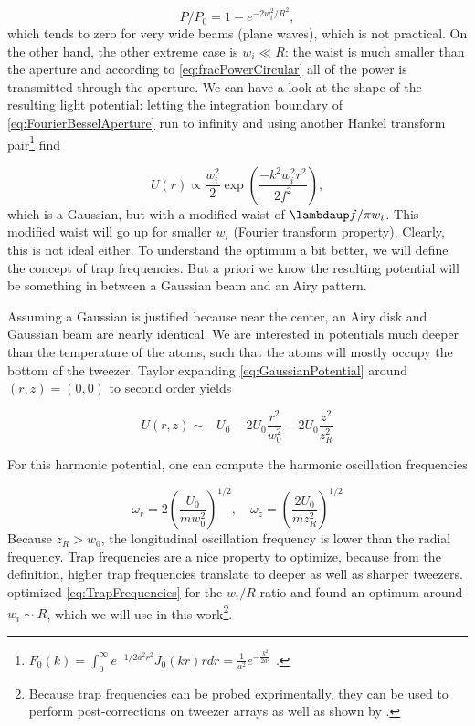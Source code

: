 \begin{equation}\label{eq:fracPowerCircular}
    P/P_0 = 1 - e^{-2w_i^2/R^2},
\end{equation}
which tends to zero for very wide beams (plane waves), which is not practical. 
On the other hand, the other extreme case is $w_i \ll R$: the waist is much smaller than the aperture and according to \cref{eq:fracPowerCircular} all of the power is transmitted through the aperture.
We can have a look at the shape of the resulting light potential: letting the integration boundary of \cref{eq:FourierBesselAperture} run to infinity and using another Hankel transform pair\footnote{$F_0(k) = \int_0^{\infty} e^{-1/2 a^2 r^2} J_0(k r)r dr = \frac{1}{a^2} e^{-\frac{k^2}{2a^2}}$ \cite{Papoulis2981}.} find 

\begin{equation}\label{eq:GaussianCase}
    U(r) \propto \frac{w_i^2}{2} \exp{\left(\frac{-k^2w_i^2 r^2}{2f^2}\right)},
\end{equation}
which is a Gaussian, but with a modified waist of $\lambdaup f / \pi w_i$.
This modified waist will go up for smaller $w_i$ (Fourier transform property). 
Clearly, this is not ideal either. 
To understand the optimum a bit better, we will define the concept of trap frequencies. 
But a priori we know the resulting potential will be something in between a Gaussian beam and an Airy pattern. 

Assuming a Gaussian is justified because near the center, an Airy disk and Gaussian beam are nearly identical.
We are interested in potentials much deeper than the temperature of the atoms, such that the atoms will mostly occupy the bottom of the tweezer. 
Taylor expanding \cref{eq:GaussianPotential} around $(r,z)=(0,0)$ to second order yields 

\begin{equation}\label{eq:ApproximateGaussianPotential}
    U(r,z) \sim -U_0 - 2U_0 \frac{r^2}{w_0^2} - 2U_0 \frac{z^2}{z_R^2}
\end{equation}


For this harmonic potential, one can compute the harmonic oscillation frequencies 

\begin{equation}\label{eq:TrapFrequencies}
    \omega_r = 2\left(\frac{U_0}{m w_0^2}\right)^{1/2}, \quad
    \omega_z= \left(\frac{2 U_0}{m z_R^2}\right)^{1/2}
\end{equation}
Because $z_R > w_0$, the longitudinal oscillation frequency is lower than the radial frequency. 
Trap frequencies are a nice property to optimize, because from the definition, higher trap frequencies translate to deeper as well as sharper tweezers. 
\cite{Madjarov2021} optimized \cref{eq:TrapFrequencies} for the $w_i/R$ ratio and found an optimum around $w_i\sim R$, which we will use in this work\footnote{Because trap frequencies can be probed exprimentally, they can be used to perform post-corrections on tweezer arrays as well as shown by \cite{Ebadi2021}.}.


